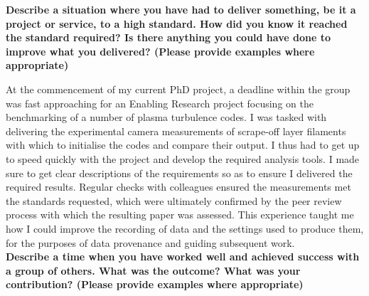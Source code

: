 \documentclass[11pt,a4paper,sans]{moderncv}        %
\begin{document}
\textbf{Describe a situation where you have had to deliver something, be it a project or service, to a high standard. How did you know it reached the standard required? Is there anything you could have done to improve what you delivered? (Please provide examples where appropriate)	}

At the commencement of my current PhD project, a deadline within the group was fast approaching for an Enabling Research project focusing on the benchmarking of a number of plasma turbulence codes. I was tasked with delivering the experimental camera measurements of scrape-off layer filaments with which to initialise the codes and compare their output. I thus had to get up to speed quickly with the project and develop the required analysis tools. I made sure to get clear descriptions of the requirements so as to ensure I delivered the required results. Regular checks with colleagues ensured the measurements met the standards requested, which were ultimately confirmed by the peer review process with which the resulting paper was assessed. This experience taught me how I could improve the recording of data and the settings used to produce them, for the purposes of data provenance and guiding subsequent work.
\\

\textbf{Describe a time when you have worked well and achieved success with a group of others. What was the outcome? What was your contribution? (Please provide examples where appropriate) }
\end{document}
